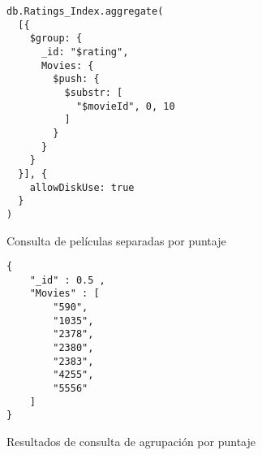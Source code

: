 \documentclass[conference,compsoc]{sty/IEEEtran}
\begin{document}
\begin{figure}
    \begin{verbatim}
db.Ratings_Index.aggregate(
  [{
    $group: {
      _id: "$rating",
      Movies: {
        $push: {
          $substr: [
            "$movieId", 0, 10
          ]
        }
      }
    }
  }], {
    allowDiskUse: true
  }
)

\end{verbatim}
\caption{Consulta de películas separadas por puntaje} 
\label{fig:peliculas-por-puntaje}
\end{figure}


\begin{figure}
    \begin{verbatim}
{
	"_id" : 0.5 ,
	"Movies" : [
		"590",
		"1035",
		"2378",	
		"2380",
		"2383",
		"4255",
		"5556"
	]
}
\end{verbatim}
\caption{Resultados de consulta de agrupación por puntaje} 
\label{fig:separacion_por_puntaje}
\end{figure}

\end{document}
